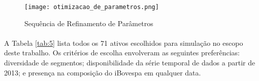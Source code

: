 \begin{figure}[!htb]
    \texttt{[image: otimizacao\_de\_parametros.png]}
    \centering
    \caption{Sequência de Refinamento de Parâmetros}
    \label{fig:444}
\end{figure}

\paragraph{} A Tabela \ref{tab:5} lista todos os 71 ativos escolhidos para simulação no escopo deste trabalho. Os critérios de escolha envolveram as seguintes preferências: diversidade de segmentos; disponibilidade da série temporal de dados a partir de 2013; e presença na composição do iBovespa em qualquer data.



